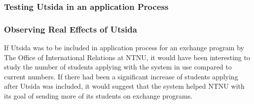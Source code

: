 \subsubsection{Testing Utsida in an application Process}


\subsubsection{Observing Real Effects of Utsida}
If Utsida was to be included in application process for an exchange program by The Office of International Relations at NTNU, it would have been interesting to study the number of students applying with the system in use compared to current numbers. If there had been a significant increase of students applying after Utsida was included, it would suggest that the system helped NTNU with its goal of sending more of its students on exchange programs.



\cleardoublepage